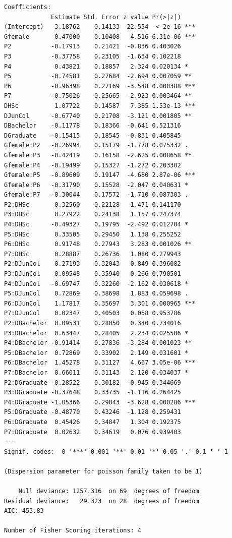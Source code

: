 \documentclass{article}\usepackage[]{graphicx}\usepackage[svgnames]{xcolor}
\makeatletter
\newenvironment{kframe}{%
 \def\at@end@of@kframe{}%
 \ifinner\ifhmode%
  \def\at@end@of@kframe{\end{minipage}}%
  \begin{minipage}{\columnwidth}%
 \fi\fi%
 \def\FrameCommand##1{\hskip\@totalleftmargin \hskip-\fboxsep
 \colorbox{shadecolor}{##1}\hskip-\fboxsep
     \hskip-\linewidth \hskip-\@totalleftmargin \hskip\columnwidth}%
 \MakeFramed {\advance\hsize-\width
   \@totalleftmargin\z@ \linewidth\hsize
   \@setminipage}}%
 {\par\unskip\endMakeFramed%
 \at@end@of@kframe}
\newenvironment{knitrout}{}{} %
\makeatother
\begin{document}
\begin{knitrout}
\begin{kframe}
\begin{verbatim}
Coefficients:
             Estimate Std. Error z value Pr(>|z|)    
(Intercept)   3.18762    0.14133  22.554  < 2e-16 ***
Gfemale       0.47000    0.10408   4.516 6.31e-06 ***
P2           -0.17913    0.21421  -0.836 0.403026    
P3           -0.37758    0.23105  -1.634 0.102218    
P4            0.43821    0.18857   2.324 0.020134 *  
P5           -0.74581    0.27684  -2.694 0.007059 ** 
P6           -0.96398    0.27169  -3.548 0.000388 ***
P7           -0.75026    0.25665  -2.923 0.003464 ** 
DHSc          1.07722    0.14587   7.385 1.53e-13 ***
DJunCol      -0.67740    0.21708  -3.121 0.001805 ** 
DBachelor    -0.11778    0.18366  -0.641 0.521316    
DGraduate    -0.15415    0.18545  -0.831 0.405845    
Gfemale:P2   -0.26994    0.15179  -1.778 0.075332 .  
Gfemale:P3   -0.42419    0.16158  -2.625 0.008658 ** 
Gfemale:P4   -0.19499    0.15327  -1.272 0.203302    
Gfemale:P5   -0.89609    0.19147  -4.680 2.87e-06 ***
Gfemale:P6   -0.31790    0.15528  -2.047 0.040631 *  
Gfemale:P7   -0.30044    0.17572  -1.710 0.087303 .  
P2:DHSc       0.32560    0.22128   1.471 0.141170    
P3:DHSc       0.27922    0.24138   1.157 0.247374    
P4:DHSc      -0.49327    0.19795  -2.492 0.012704 *  
P5:DHSc       0.33505    0.29450   1.138 0.255252    
P6:DHSc       0.91748    0.27943   3.283 0.001026 ** 
P7:DHSc       0.28887    0.26736   1.080 0.279943    
P2:DJunCol    0.27193    0.32043   0.849 0.396082    
P3:DJunCol    0.09548    0.35940   0.266 0.790501    
P4:DJunCol   -0.69747    0.32260  -2.162 0.030618 *  
P5:DJunCol    0.72869    0.38698   1.883 0.059698 .  
P6:DJunCol    1.17817    0.35697   3.301 0.000965 ***
P7:DJunCol    0.02347    0.40503   0.058 0.953786    
P2:DBachelor  0.09531    0.28050   0.340 0.734016    
P3:DBachelor  0.63447    0.28405   2.234 0.025506 *  
P4:DBachelor -0.91414    0.27836  -3.284 0.001023 ** 
P5:DBachelor  0.72869    0.33902   2.149 0.031601 *  
P6:DBachelor  1.45278    0.31127   4.667 3.05e-06 ***
P7:DBachelor  0.66011    0.31143   2.120 0.034037 *  
P2:DGraduate -0.28522    0.30182  -0.945 0.344669    
P3:DGraduate -0.37648    0.33735  -1.116 0.264425    
P4:DGraduate -1.05366    0.29043  -3.628 0.000286 ***
P5:DGraduate -0.48770    0.43246  -1.128 0.259431    
P6:DGraduate  0.45426    0.34847   1.304 0.192375    
P7:DGraduate  0.02632    0.34619   0.076 0.939403    
---
Signif. codes:  0 '***' 0.001 '**' 0.01 '*' 0.05 '.' 0.1 ' ' 1

(Dispersion parameter for poisson family taken to be 1)

    Null deviance: 1257.316  on 69  degrees of freedom
Residual deviance:   29.323  on 28  degrees of freedom
AIC: 453.83

Number of Fisher Scoring iterations: 4
\end{verbatim}
\end{kframe}
\end{knitrout}
\end{document}
